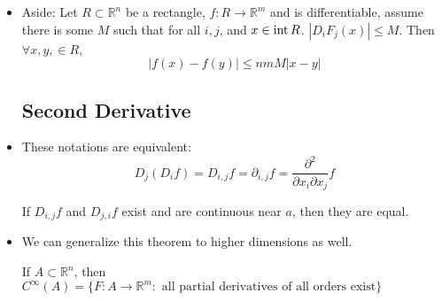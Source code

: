 \begin{itemize}
\begin{proof}
        Set $b_1=(a_1+h_1,\dots,a_i+h_i,\dots,a_n)$ so $b_0=a,b_n=a+h$. Then 
        \begin{align}
            e(h) &= f(a+h)-f(a) - \sum (\partial_i f)(a) \cdot h_i \\ 
            &= f(b_n)-f(b_0)-\sum (\partial_i f)(a) \cdot h_i \\ 
            &= \sum f(b_i)-f(b_{i-1})-\sum (\partial_i f)(a) \cdot h_i
        \end{align}
        which by the mean value theorem, there exists $c_i$ in between $b_{i-1}$ and $b_{i}$ such that 
        \begin{equation}
            c_i = (a_1+h_1, a_{i-1}+h_{hi-1},\gamma_i, a_{i+1},a_n)
        \end{equation}
        where $\gamma_i \in (a_i, a_i + h_i)$. Then:
        \begin{equation}
            \sum (D_i F)(c_i)h_i - (D_if)(a)h_i = \sum_{i=1}^n ((D_if)(c_i)-(D_if)(a))h_i = e(h)
        \end{equation} 
        We want to now compute 
        \begin{align}
            \lim_{h\to 0} \frac{|e(h)|}{|h|} &= \lim_{h\to 0} \frac{\left|\sum (D_i F)(c_i)h_i - (D_if)(a)h_i = \sum_{i=1}^n ((D_if)(c_i)-(D_if)(a))h_i\right|}{|h|} 
        \end{align}
        and we need to show that 
        \begin{equation}
            0 = \lim_{h\to 0} \sum |D_if(c_i)-(D_if)(a)| \cdot \frac{|h_i|}{h}
        \end{equation}
        As $h\to 0$, $c_i\to a$. By continuity of $\partial_i f$, we know $D_if(c_i)-D_i(f_a)\to 0$, so the above limit is zero.
    \end{proof}
    \item Aside: Let $R\subset \mathbb{R}^n$ be a rectangle, $f:R \to \mathbb{R}^m$ and is differentiable, assume there is some $M$ such that for all $i,j$, and $x\in \operatorname{int} R$. $|D_i F_j(x)| \le M$. Then $\forall x,y,\in R$,
    \begin{equation}
        |f(x)-f(y)| \le nmM|x-y|
    \end{equation}
    \subsection{Second Derivative}
    \item These notations are equivalent:
    \begin{equation}
        D_j(D_if)=D_{i,j}f = \partial_{i,j}f = \frac{\partial^2}{\partial x_i \partial x_j}f
    \end{equation}
    \begin{theorem}
        If $D_{i,j}f$ and $D_{j,i}f$ exist and are continuous near $a$, then they are equal.
    \end{theorem}
    \item We can generalize this theorem to higher dimensions as well.
    \begin{definition}
        If $A \subset \mathbb{R}^n$, then $C^\infty (A) = \{F: A \rightarrow \mathbb{R}^m:\text{ all partial derivatives of all orders exist}\}$
    \end{definition}
\end{itemize}